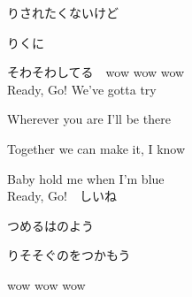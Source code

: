 {りされたくないけど

りくに

そわそわしてる　wow wow wow
\\

Ready, Go! We've gotta try

Wherever you are I'll be there

Together we can make it, I know

Baby hold me when I'm blue
\\

Ready, Go!　しいね

つめるはのよう

りそそぐのをつかもう

wow wow wow

}